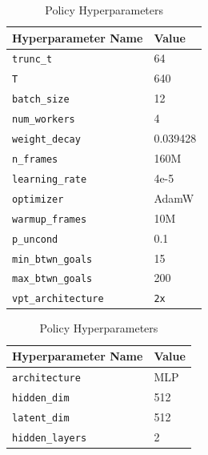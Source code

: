 \renewcommand{\arraystretch}{1.25}
\begin{table}[h]
    \centering
    \begin{minipage}[b]{0.45\textwidth}
        \centering
        \begin{tabular}{|l|l|}
            \hline
            \textbf{Hyperparameter Name} & \textbf{Value} \\ \hline
            \texttt{trunc\_t} & 64 \\ \hline
            \texttt{T} & 640 \\ \hline
            \texttt{batch\_size} & 12 \\ \hline
            \texttt{num\_workers} & 4 \\ \hline
            \texttt{weight\_decay} & 0.039428 \\ \hline
            \texttt{n\_frames} & 160M \\ \hline
            \texttt{learning\_rate} & 4e-5 \\ \hline
            \texttt{optimizer} & AdamW \citep{adamw} \\ \hline
            \texttt{warmup\_frames} & 10M \\ \hline
            \texttt{p\_uncond} & 0.1 \\ \hline
            \texttt{min\_btwn\_goals} & 15 \\ \hline
            \texttt{max\_btwn\_goals} & 200 \\ \hline
            \texttt{vpt\_architecture} & \texttt{2x} \\ \hline
        \end{tabular}
        \vspace{0.5em}
        \caption{Policy Hyperparameters}
        \label{table:model_hparams}
    \end{minipage}\hfill
    \begin{minipage}[b]{0.45\textwidth}
        \centering
        \begin{tabular}{|l|l|}
            \hline
            \textbf{Hyperparameter Name} & \textbf{Value} \\ \hline
            \texttt{architecture} & MLP \\ \hline
            \texttt{hidden\_dim} & 512 \\ \hline
            \texttt{latent\_dim} & 512 \\ \hline
            \texttt{hidden\_layers} & 2 \\ \hline

\end{tabular}
\end{minipage}
\end{table}
